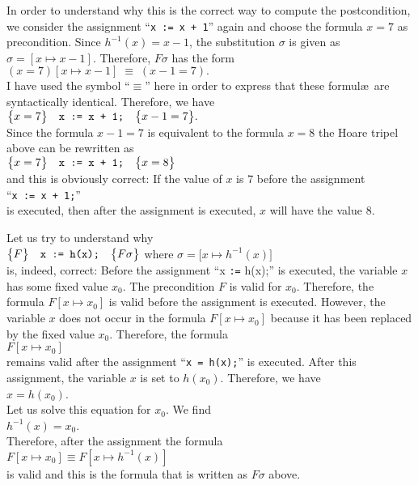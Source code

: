 In order to understand why this is the correct way to compute the 
postcondition, we consider the assignment
``\texttt{x := x + 1}'' again and choose the formula $x = 7$ as precondition.  
Since $h^{-1}(x) = x - 1$, the substitution $\sigma$ is given as
$\sigma = [ x \mapsto x - 1 ]$.  Therefore, $F\sigma$ has the form
\\[0.2cm]
\hspace*{1.3cm}
$ (x = 7)[x \mapsto x - 1] \;\equiv\; (x - 1 = 7). $
\\[0.2cm]
I have used the symbol ``$\equiv$'' here in order to express that these formul\ae\ are
syntactically identical.  
Therefore, we have
\\[0.2cm]
\hspace*{1.3cm}
$ \bigl\{x = 7\bigr\}\quad\texttt{x := x + 1;}\quad\bigl\{x - 1 = 7\bigr\}. $
\\[0.2cm]
Since the formula $x - 1 = 7$ is equivalent to the formula $x = 8$ the Hoare tripel above can be
rewritten as  
\\[0.2cm]
\hspace*{1.3cm}
$ \bigl\{x = 7\bigr\}\quad\texttt{x := x + 1;}\quad\bigl\{x = 8\bigr\} $
\\[0.2cm]
and this is obviously correct:  If the value of $x$ is $7$ before the assignment
\\[0.2cm]
\hspace*{1.3cm}
``\texttt{x := x + 1;}'' 
\\[0.2cm]
is executed, then after the assignment is executed, $x$ will have the value $8$.

Let us try to understand why
\\[0.2cm]
\hspace*{1.3cm}
$\bigl\{F\bigr\}\quad\texttt{x := h(x);}\quad\bigl\{F\sigma\bigr\}$ \quad where \quad 
$\sigma = \bigl[x \mapsto h^{-1}(x)\bigr] $
\\[0.2cm]
is, indeed, correct:   Before the assignment ``x \texttt{:=} h(x);'' is executed,
the variable $x$ has some fixed value $x_0$.  The precondition $F$ is valid for $x_0$.  Therefore,
the formula $F[x \mapsto x_0]$ is valid before the assignment is executed.  However,
the variable $x$ does not occur in the formula $F[x \mapsto x_0]$ because it has been replaced by
the fixed value $x_0$.  Therefore, the formula
\\[0.2cm]
\hspace*{1.3cm}
$ F[x \mapsto x_0] $
\\[0.2cm]
remains valid after the assignment  ``\texttt{x = h(x);}'' is executed.  After this assignment,
the variable $x$ is set to $h(x_0)$. Therefore, we have
\\[0.2cm]
\hspace*{1.3cm}
$x = h(x_0)$.
\\[0.2cm]  
Let us solve this equation for $x_0$.  We find
\\[0.2cm]
\hspace*{1.3cm}
$h^{-1}(x) = x_0$.
\\[0.2cm]
Therefore, after the assignment the formula 
\\[0.2cm]
\hspace*{1.3cm}
$ F[x \mapsto x_0] \equiv  F[x \mapsto h^{-1}(x)]$ 
\\[0.2cm]
is valid and  this is the formula that is written as $F\sigma$ above.

